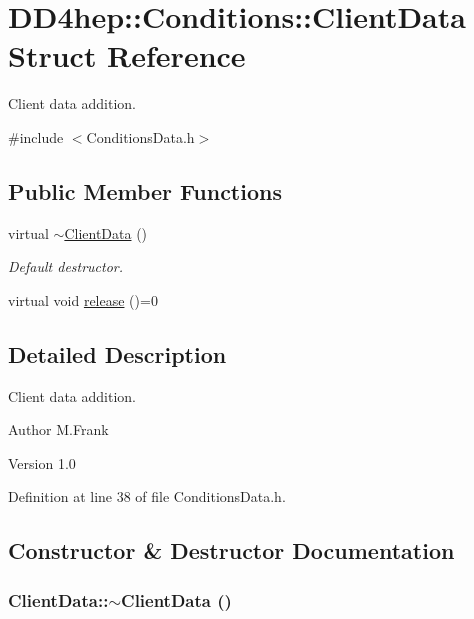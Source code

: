 \hypertarget{struct_d_d4hep_1_1_conditions_1_1_client_data}{
\section{DD4hep::Conditions::ClientData Struct Reference}
\label{struct_d_d4hep_1_1_conditions_1_1_client_data}
}


Client data addition.  


{\ttfamily \#include $<$ConditionsData.h$>$}\subsection*{Public Member Functions}
\begin{DoxyCompactItemize}
\item 
virtual \hyperlink{struct_d_d4hep_1_1_conditions_1_1_client_data_a722d09ec49cd3e0f33c1394a78441070}{$\sim$ClientData} ()
\begin{DoxyCompactList}\small\item\em Default destructor. \item\end{DoxyCompactList}\item 
virtual void \hyperlink{struct_d_d4hep_1_1_conditions_1_1_client_data_a70db3debbb53fc7249ca198a2cd32e9b}{release} ()=0
\end{DoxyCompactItemize}


\subsection{Detailed Description}
Client data addition. \begin{DoxyAuthor}{Author}
M.Frank 
\end{DoxyAuthor}
\begin{DoxyVersion}{Version}
1.0 
\end{DoxyVersion}


Definition at line 38 of file ConditionsData.h.

\subsection{Constructor \& Destructor Documentation}
\hypertarget{struct_d_d4hep_1_1_conditions_1_1_client_data_a722d09ec49cd3e0f33c1394a78441070}{
\subsubsection[{$\sim$ClientData}]{\setlength{\rightskip}{0pt plus 5cm}ClientData::$\sim$ClientData ()}}
\label{struct_d_d4hep_1_1_conditions_1_1_client_data_a722d09ec49cd3e0f33c1394a78441070}


